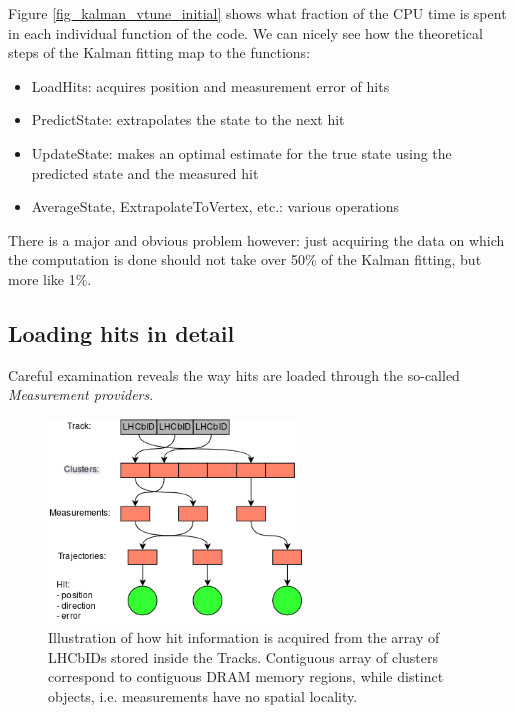 \documentclass[12pt]{article}
\begin{document}
Figure \ref{fig_kalman_vtune_initial} shows what fraction of the CPU time is spent in each individual function of the code. We can nicely see how the theoretical steps of the Kalman fitting map to the functions:
\begin{itemize}
	\item LoadHits: acquires position and measurement error of hits
	\item PredictState: extrapolates the state to the next hit
	\item UpdateState: makes an optimal estimate for the true state using the predicted state and the measured hit
	\item AverageState, ExtrapolateToVertex, etc.: various operations
\end{itemize}
There is a major and obvious problem however: just acquiring the data on which the computation is done should not take over 50\% of the Kalman fitting, but more like 1\%.	


\subsection{Loading hits in detail}

Careful examination reveals the way hits are loaded through the so-called \textit{Measurement providers}.
	
\begin{figure}[H]
	\begin{center}
		\includegraphics[width=0.6\textwidth]{kalmanfit_loadhits_schematic}
	\end{center}
	\caption{Illustration of how hit information is acquired from the array of LHCbIDs stored inside the Tracks. Contiguous array of clusters correspond to contiguous DRAM memory regions, while distinct objects, i.e. measurements have no spatial locality.}
	\label{fig_kalmanfit_loadhits_schematic}
\end{figure}
\end{document}
